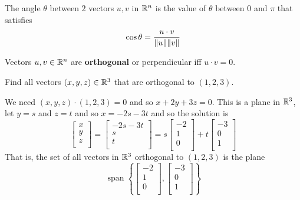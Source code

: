 \documentclass{article}
\DeclareMathOperator{\spn}{span}
\begin{document}
    \begin{definition}
      The angle $\theta$ between $2$ vectors $u, v$ in $\mathbb{R}^n$ is the value of $\theta$ between $0$ and $\pi$ that satisfies \[
        \cos \theta = \frac{u\cdot v}{\norm{u}\norm{v}}
      \]
    \end{definition}
    \begin{definition}
      Vectors $u, v \in \mathbb{R}^n$ are \textbf{orthogonal} or perpendicular iff $u \cdot v = 0$.
    \end{definition}
    \begin{example}
      Find all vectors $(x, y, z) \in \mathbb{R}^3$ that are orthogonal to $(1, 2, 3)$.

      We need $(x, y, z) \cdot (1, 2, 3) = 0$ and so $x + 2y + 3z = 0$.
      This is a plane in $\mathbb{R}^3$, let $y = s$ and $z = t$ and so $x = -2s - 3t$ and so the solution is \[
        \begin{bmatrix}
          x\\y\\z\\
        \end{bmatrix} =
        \begin{bmatrix}
          -2s - 3t\\
          s\\t\\
        \end{bmatrix} = s
        \begin{bmatrix}
          -2\\1\\0\\
        \end{bmatrix} + t
        \begin{bmatrix}
          -3\\0\\1\\
        \end{bmatrix}
      \]
      That is, the set of all vectors in $\mathbb{R}^3$ orthogonal to $(1, 2, 3)$ is the plane \[
        \spn\left\{
          \begin{bmatrix}
            -2\\1\\0\\
          \end{bmatrix},
          \begin{bmatrix}
            -3\\0\\1\\
        \end{bmatrix}\right\}
      \]
    \end{example}
\end{document}

